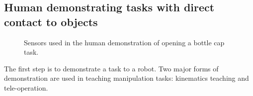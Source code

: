 \subsection{Human demonstrating tasks with direct contact to objects}
\label{cha4:sec2:demo}


\begin{figure}
  \centering
    \caption{\scriptsize{Sensors used in the human demonstration of opening a bottle cap task.}}
  \label{fig:devices}
\end{figure}


The first step is to demonstrate a task to a robot. Two major forms of demonstration are used in teaching manipulation tasks: kinematics teaching and tele-operation.

